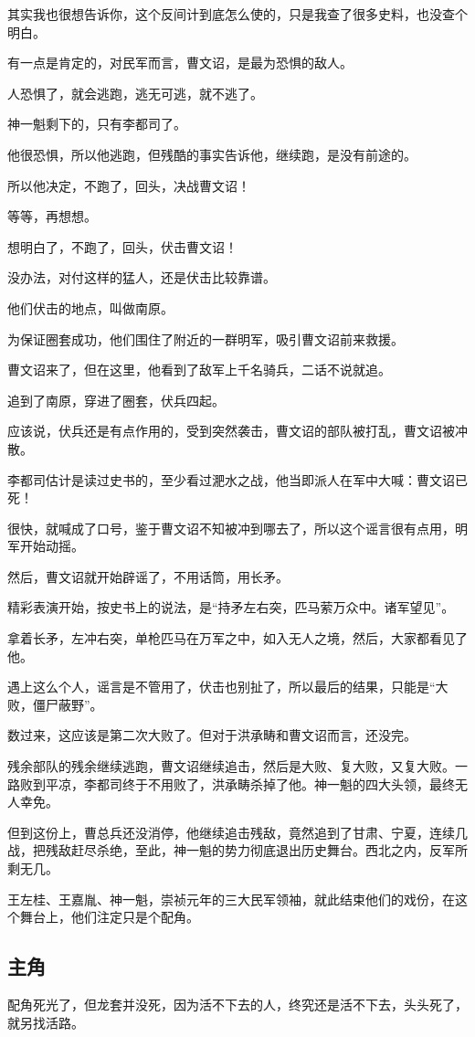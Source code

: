 \begin{multicols}{\theparacolNo}
其实我也很想告诉你，这个反间计到底怎么使的，只是我查了很多史料，也没查个明白。

有一点是肯定的，对民军而言，曹文诏，是最为恐惧的敌人。

人恐惧了，就会逃跑，逃无可逃，就不逃了。

神一魁剩下的，只有李都司了。

他很恐惧，所以他逃跑，但残酷的事实告诉他，继续跑，是没有前途的。

所以他决定，不跑了，回头，决战曹文诏！

等等，再想想。

想明白了，不跑了，回头，伏击曹文诏！

没办法，对付这样的猛人，还是伏击比较靠谱。

他们伏击的地点，叫做南原。

为保证圈套成功，他们围住了附近的一群明军，吸引曹文诏前来救援。

曹文诏来了，但在这里，他看到了敌军上千名骑兵，二话不说就追。

追到了南原，穿进了圈套，伏兵四起。

应该说，伏兵还是有点作用的，受到突然袭击，曹文诏的部队被打乱，曹文诏被冲散。

李都司估计是读过史书的，至少看过淝水之战，他当即派人在军中大喊：曹文诏已死！

很快，就喊成了口号，鉴于曹文诏不知被冲到哪去了，所以这个谣言很有点用，明军开始动摇。

然后，曹文诏就开始辟谣了，不用话筒，用长矛。

精彩表演开始，按史书上的说法，是“持矛左右突，匹马萦万众中。诸军望见”。

拿着长矛，左冲右突，单枪匹马在万军之中，如入无人之境，然后，大家都看见了他。

遇上这么个人，谣言是不管用了，伏击也别扯了，所以最后的结果，只能是“大败，僵尸蔽野”。

数过来，这应该是第二次大败了。但对于洪承畴和曹文诏而言，还没完。

残余部队的残余继续逃跑，曹文诏继续追击，然后是大败、复大败，又复大败。一路败到平凉，李都司终于不用败了，洪承畴杀掉了他。神一魁的四大头领，最终无人幸免。

但到这份上，曹总兵还没消停，他继续追击残敌，竟然追到了甘肃、宁夏，连续几战，把残敌赶尽杀绝，至此，神一魁的势力彻底退出历史舞台。西北之内，反军所剩无几。

王左桂、王嘉胤、神一魁，崇祯元年的三大民军领袖，就此结束他们的戏份，在这个舞台上，他们注定只是个配角。

\subsection{主角}
配角死光了，但龙套并没死，因为活不下去的人，终究还是活不下去，头头死了，就另找活路。


\end{multicols}
